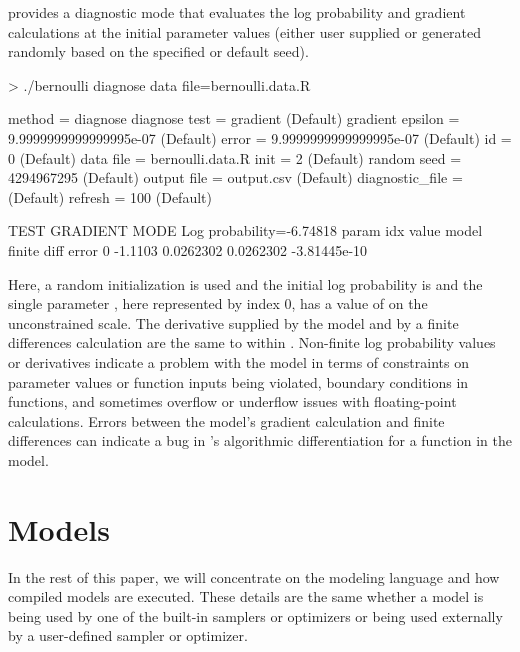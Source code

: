 \documentclass[article]{jss}
\begin{document}
 provides a diagnostic mode that evaluates the log
probability and gradient calculations at the initial parameter values
(either user supplied or generated randomly based on the specified
or default seed).
%
\begin{CodeChunk}
\begin{CodeInput}
> ./bernoulli diagnose data file=bernoulli.data.R 
\end{CodeInput}
\begin{CodeOutput}
 method = diagnose
   diagnose
     test = gradient (Default)
       gradient
         epsilon = 9.9999999999999995e-07 (Default)
         error = 9.9999999999999995e-07 (Default)
 id = 0 (Default)
 data
   file = bernoulli.data.R
 init = 2 (Default)
 random
   seed = 4294967295 (Default)
 output
   file = output.csv (Default)
   diagnostic_file =  (Default)
   refresh = 100 (Default)

TEST GRADIENT MODE
 Log probability=-6.74818
 param idx           value           model     finite diff           error
         0         -1.1103       0.0262302       0.0262302    -3.81445e-10
\end{CodeOutput}
\end{CodeChunk}
%
Here, a random initialization is used and the initial log probability
is  and the single parameter , here
represented by index 0, has a value of  on the
unconstrained scale.  The derivative supplied by the model and by a
finite differences calculation are the same to within
.  Non-finite log probability values or derivatives
indicate a problem with the model in terms of constraints on parameter
values or function inputs being violated, boundary conditions in
functions, and sometimes overflow or underflow issues with
floating-point calculations.  Errors between the model's gradient
calculation and finite differences can indicate a bug in
's algorithmic differentiation for a function in the model.


\section{Models}

In the rest of this paper, we will concentrate on the modeling
language and how compiled models are executed.  These details are the
same whether a  model is being used by one of the
built-in samplers or optimizers or being used externally by a
user-defined sampler or optimizer.
\end{document}
